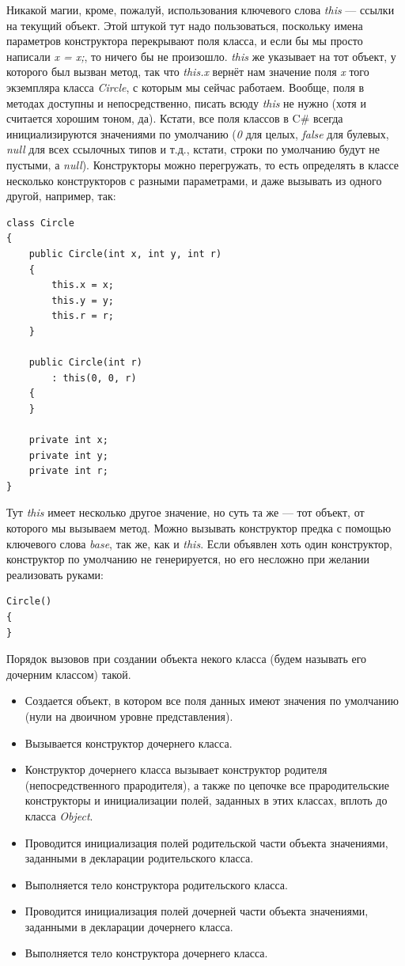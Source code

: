 \documentclass{../../text-style}
\begin{document}
Никакой магии, кроме, пожалуй, использования ключевого слова \textit{this} --- ссылки на текущий объект. Этой штукой тут надо пользоваться, поскольку имена параметров конструктора перекрывают поля класса, и если бы мы просто написали \textit{x = x;}, то ничего бы не произошло. \textit{this} же указывает на тот объект, у которого был вызван метод, так что \textit{this.x} вернёт нам значение поля \textit{x} того экземпляра класса \textit{Circle}, с которым мы сейчас работаем. Вообще, поля в методах доступны и непосредственно, писать всюду \textit{this} не нужно (хотя и считается хорошим тоном, да). Кстати, все поля классов в C\# всегда инициализируются значениями по умолчанию (\textit{0} для целых, \textit{false} для булевых, \textit{null} для всех ссылочных типов и т.д., кстати, строки по умолчанию будут не пустыми, а \textit{null}). Конструкторы можно перегружать, то есть определять в классе несколько конструкторов с разными параметрами, и даже вызывать из одного другой, например, так:

\begin{verbatim}
class Circle
{
    public Circle(int x, int y, int r)
    {
        this.x = x;
        this.y = y;
        this.r = r;
    }

    public Circle(int r)
        : this(0, 0, r)
    {
    }

    private int x;
    private int y;
    private int r;
}
\end{verbatim}

Тут \textit{this} имеет несколько другое значение, но суть та же --- тот объект, от которого мы вызываем метод. Можно вызывать конструктор предка с помощью ключевого слова \textit{base}, так же, как и \textit{this}. Если объявлен хоть один конструктор, конструктор по умолчанию не генерируется, но его несложно при желании реализовать руками: 

\begin{verbatim}
Circle()
{
}
\end{verbatim}

Порядок вызовов при создании объекта некого класса (будем называть его дочерним классом) такой.
\begin{itemize}
    \item Создается объект, в котором все поля данных имеют значения по умолчанию (нули на двоичном уровне представления).
    \item Вызывается конструктор дочернего класса.
    \item Конструктор дочернего класса вызывает конструктор родителя (непосредственного прародителя), а также по цепочке все прародительские конструкторы и инициализации полей, заданных в этих классах, вплоть до класса \textit{Object}.
    \item Проводится инициализация полей родительской части объекта значениями, заданными в декларации родительского класса.
    \item Выполняется тело конструктора родительского класса.
    \item Проводится инициализация полей дочерней части объекта значениями, заданными в декларации дочернего класса.
    \item Выполняется тело конструктора дочернего класса.
\end{itemize}
\end{document}
